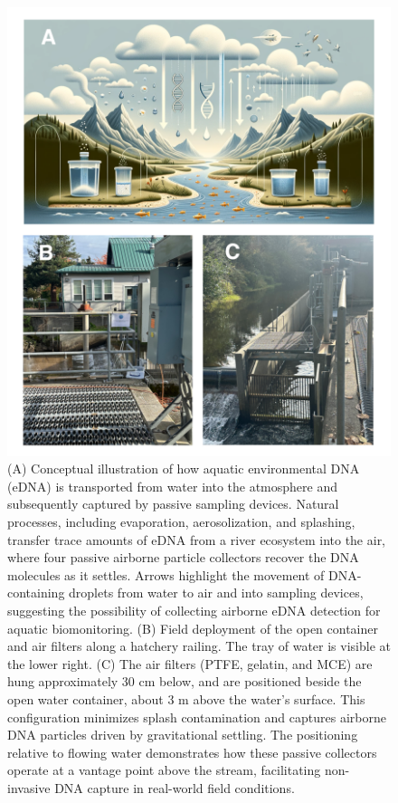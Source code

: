 \documentclass{article}
\begin{document}
\begin{figure}[tbhp] 
\centering
\includegraphics[width=13.5cm]{Plots/Picture1.png}  
\caption{(A) Conceptual illustration of how aquatic environmental DNA (eDNA) is transported from water into the atmosphere and subsequently captured by passive sampling devices. Natural processes, including evaporation, aerosolization, and splashing, transfer trace amounts of eDNA from a river ecosystem into the air, where four passive airborne particle collectors recover the DNA molecules as it settles. Arrows highlight the movement of DNA-containing droplets from water to air and into sampling devices, suggesting the possibility of collecting airborne eDNA detection for aquatic biomonitoring. (B) Field deployment of the open container and air filters along a hatchery railing. The tray of water is visible at the lower right. (C) The air filters (PTFE, gelatin, and MCE) are hung approximately 30 cm below, and are positioned beside the open water container, about 3 m above the water’s surface. This configuration minimizes splash contamination and captures airborne DNA particles driven by gravitational settling. The positioning relative to flowing water demonstrates how these passive collectors operate at a vantage point above the stream, facilitating non-invasive DNA capture in real-world field conditions.}
\label{fig:AI_physical_model}
\end{figure}
\end{document}
